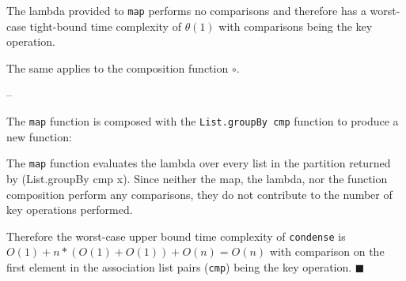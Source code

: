 \documentclass[../main.tex]{subfiles}
\begin{document}
The lambda provided to \texttt{map} performs no comparisons and therefore has a worst-case tight-bound time complexity of
$\theta(1)$ with comparisons being the key operation.

The same applies to the composition function $\circ$.

--








The \texttt{map} function is composed with the \texttt{List.groupBy cmp} function to produce a new function:

The \texttt{map} function evaluates the lambda over every list in the partition returned by (List.groupBy cmp x).  Since
neither the map, the lambda, nor the function composition perform any comparisons, they do not contribute to the number
of key operations performed.

Therefore the worst-case upper bound time complexity of \texttt{condense} is $O(1) + n*(O(1) + O(1)) + O(n) = O(n)$ with comparison on the first element in
the association list pairs (\texttt{cmp}) being the key operation.
$\blacksquare$

\end{document}
